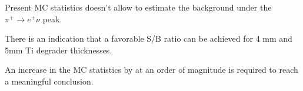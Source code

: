 Present MC statistics doesn't allow to estimate the background under the $\pi^+ \to e^+ \nu$ peak.

There is an indication that a favorable S/B ratio can be achieved for 4 mm and 5mm
Ti degrader thicknesses.

An increase in the MC statistics by at an order of magnitude is required to reach
a meaningful conclusion.

